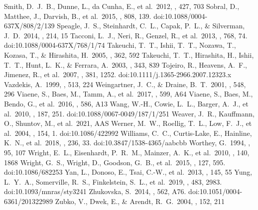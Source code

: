 \documentclass{aa}
\begin{document}
\begin{thebibliography}{}
  Smith, D.~J.~B., Dunne, L., da Cunha, E., et al.\ 2012, \mnras, 427, 703 
  Sobral, D., Matthee, J., Darvish, B., et al.\ 2015, \apj, 808, 139. doi:10.1088/0004-637X/808/2/139
  Speagle, J.~S., Steinhardt, C.~L., Capak, P.~L., \& Silverman, J.~D.\ 2014, \apjs, 214, 15
  Tacconi, L.~J., Neri, R., Genzel, R., et al.\ 2013, \apj, 768, 74. doi:10.1088/0004-637X/768/1/74
  Takeuchi, T.~T., Ishii, T.~T., Nozawa, T., Kozasa, T., \& Hirashita, H.\ 2005, \mnras, 362, 592 
 Takeuchi, T.~T., Hirashita, H., Ishii, T.~T., Hunt, L.~K., \& Ferrara, A.\ 2003, \mnras, 343, 839
 Tojeiro, R., Heavens, A.~F., Jimenez, R., et al.\ 2007, \mnras, 381, 1252. doi:10.1111/j.1365-2966.2007.12323.x
  Vazdekis, A.\ 1999, \apj, 513, 224 
  Weingartner, J.~C., \& Draine, B.~T.\ 2001, \apj, 548, 296
  Viaene, S., Baes, M., Tamm, A., et al.\ 2017, \aap, 599, A64 
  Viaene, S., Baes, M., Bendo, G., et al.\ 2016, \aap, 586, A13
  Wang, W.-H., Cowie, L.~L., Barger, A.~J., et al.\ 2010, \apjs, 187, 251. doi:10.1088/0067-0049/187/1/251
  Weaver, J.~R., Kauffmann, O., Shuntov, M., et al.\ 2021, AAS
  Werner, M.~W., Roellig, T.~L., Low, F.~J., et al.\ 2004, \apjs, 154, 1. doi:10.1086/422992
  Williams, C.~C., Curtis-Lake, E., Hainline, K.~N., et al.\ 2018, \apjs, 236, 33. doi:10.3847/1538-4365/aabcbb
  Worthey, G.\ 1994, \apjs, 95, 107 
  Wright, E.~L., Eisenhardt, P.~R.~M., Mainzer, A.~K., et al.\ 2010, \aj, 140, 1868
  Wright, G.~S., Wright, D., Goodson, G.~B., et al.\ 2015, \pasp, 127, 595. doi:10.1086/682253
  Yan, L., Donoso, E., Tsai, C.-W., et al.\ 2013, \aj, 145, 55
  Yung, L.~Y.~A., Somerville, R.~S., Finkelstein, S.~L., et al.\ 2019, \mnras, 483, 2983. doi:10.1093/mnras/sty3241
  Zhukovska, S.\ 2014, \aap, 562, A76. doi:10.1051/0004-6361/201322989
  Zubko, V., Dwek, E., \& Arendt, R.~G.\ 2004, \apjs, 152, 211 
 \end{thebibliography}
\end{document}
